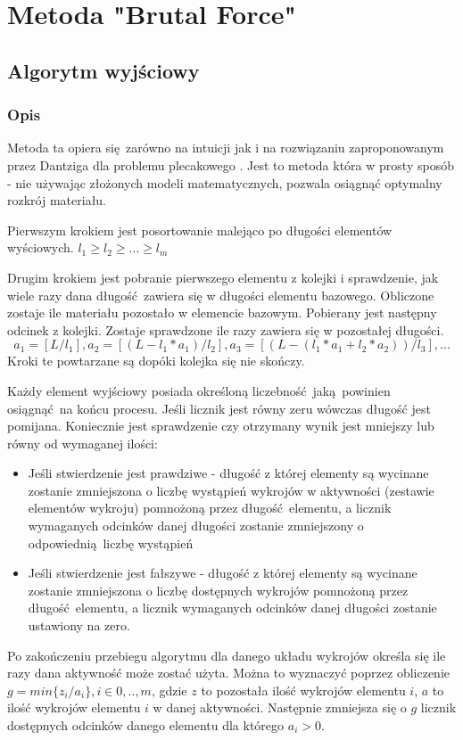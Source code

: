 \section{Metoda "Brutal Force"}
\subsection{Algorytm wyjściowy}
\subsubsection{Opis}
Metoda ta opiera się zarówno na intuicji jak i na rozwiązaniu zaproponowanym przez Dantziga dla problemu plecakowego \cite{DantzigArticle}. Jest to metoda która w prosty sposób - nie używając złożonych modeli matematycznych, pozwala osiągnąć optymalny rozkrój materiału.

Pierwszym krokiem jest posortowanie malejąco po długości elementów wyściowych. $l_1 \ge l_2 \ge ... \ge l_m$

Drugim krokiem jest pobranie pierwszego elementu z kolejki i sprawdzenie, jak wiele razy dana długość zawiera się w długości elementu bazowego. Obliczone zostaje ile materiału pozostało w elemencie bazowym. Pobierany jest następny odcinek z kolejki. Zostaje sprawdzone ile razy zawiera się w pozostałej długości.
\begin{equation}\label{base_dantizg}
a_1 = [L/l_1], a_2 = [(L-l_1*a_1)/l_2], a_3 = [(L-(l_1*a_1+l_2*a_2))/l_3], ...
\end{equation}
Kroki te powtarzane są dopóki kolejka się nie skończy.

Każdy element wyjściowy posiada określoną liczebność jaką powinien osiągnąć na końcu procesu. Jeśli licznik jest równy zeru wówczas długość jest pomijana. Koniecznie jest sprawdzenie czy otrzymany wynik jest mniejszy lub równy od wymaganej ilości:
\begin{itemize}
  \item Jeśli stwierdzenie jest prawdziwe - długość z której elementy są wycinane zostanie zmniejszona o liczbę wystąpień wykrojów w aktywności (zestawie elementów wykroju) pomnożoną przez długość elementu, a licznik wymaganych odcinków danej długości zostanie zmniejszony o odpowiednią liczbę wystąpień
  \item Jeśli stwierdzenie jest fałszywe - długość z której elementy są wycinane zostanie zmniejszona o liczbę dostępnych wykrojów pomnożoną przez długość elementu, a licznik wymaganych odcinków danej długości zostanie ustawiony na zero.
\end{itemize}
Po zakończeniu przebiegu algorytmu dla danego układu wykrojów określa się ile razy dana aktywność może zostać użyta. Można to wyznaczyć poprzez obliczenie $g = min\{z_i/a_i\}, i \in {0,..,m}$, gdzie $z$ to pozostała ilość wykrojów elementu $i$, $a$ to ilość wykrojów elementu $i$ w danej aktywności. Następnie zmniejsza się o $g$ licznik dostępnych odcinków danego elementu dla którego $a_i > 0$.

